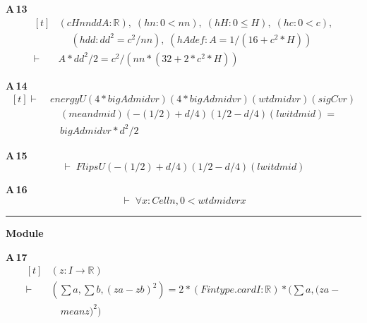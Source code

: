 \noindent\textbf{A\,13}\quad{}
{\footnotesize\[ \begin{aligned}[t]
&(\mathit{c} \mathit{H} \mathit{nn} \mathit{dd} \mathit{A} : \mathbb{R} ),\; (\mathit{hn} : 0 < \mathit{nn}),\; (\mathit{hH} : 0 \leq \mathit{H}),\; (\mathit{hc} : 0 < \mathit{c}),\\
&\quad \; (\mathit{hdd} : \mathit{dd} ^{2} = \mathit{c} ^{2} / \mathit{nn}),\; (\mathit{hAdef} : \mathit{A} = 1 / (16 + \mathit{c} ^{2} * \mathit{H}))\\
\vdash\;&\mathit{A} * \mathit{dd} ^{2} / 2 = \mathit{c} ^{2} / (\mathit{nn} * (32 + 2 * \mathit{c} ^{2} * \mathit{H}))
\end{aligned} \]}

\noindent\textbf{A\,14}\quad{}
{\footnotesize\[ \begin{aligned}[t]
\vdash\;&\mathit{energyU} (4 * \mathit{bigA} \mathit{d} \mathit{mid} \mathit{vr}) (4 * \mathit{bigA} \mathit{d} \mathit{mid} \mathit{vr}) (\mathit{wt} \mathit{d} \mathit{mid} \mathit{vr}) (\mathit{sigC} \mathit{vr})\\
&\quad (\mathit{mean} \mathit{d} \mathit{mid}) (-(1/2) + \mathit{d}/4) (1/2 - \mathit{d}/4) (\mathit{lwit} \mathit{d} \mathit{mid}) =\\
&\quad \mathit{bigA} \mathit{d} \mathit{mid} \mathit{vr} * \mathit{d} ^{2} / 2
\end{aligned} \]}

\noindent\textbf{A\,15}\quad{}
{\footnotesize\[ \vdash\; \mathit{FlipsU} (-(1/2) + \mathit{d}/4) (1/2 - \mathit{d}/4) (\mathit{lwit} \mathit{d} \mathit{mid}) \]}

\noindent\textbf{A\,16}\quad{}
{\footnotesize\[ \vdash\; \forall \mathit{x} : \mathit{Cell} \mathit{n}, 0 < \mathit{wt} \mathit{d} \mathit{mid} \mathit{vr} \mathit{x} \]}

\vspace{4pt}\noindent\rule{\columnwidth}{0.4pt}\par\vspace{2pt}
\noindent\textbf{Module }\par\vspace{3pt}

\noindent\textbf{A\,17}\quad{}
{\footnotesize\[ \begin{aligned}[t]
&(\mathit{z} : \mathit{I} \to \mathbb{R} )\\
\vdash\;&(\textstyle\sum \mathit{a},\textstyle\sum \mathit{b},(\mathit{z} \mathit{a}-\mathit{z} \mathit{b})^{2})=2*(\mathit{Fintype}.\mathit{card} \mathit{I}:\mathbb{R} )*(\textstyle\sum \mathit{a},(\mathit{z} \mathit{a}-\\
&\quad \mathit{mean} \mathit{z})^{2})
\end{aligned} \]}

